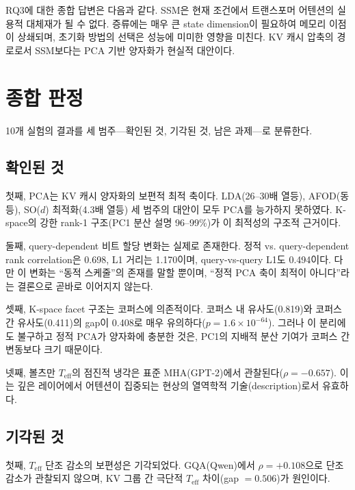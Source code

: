 \documentclass[11pt,a4paper]{article}
\newcommand{\teff}{T_\mathrm{eff}}
\begin{document}
RQ3에 대한 종합 답변은 다음과 같다. SSM은 현재 조건에서 트랜스포머 어텐션의 실용적 대체재가 될 수 없다. 증류에는 매우 큰 state dimension이 필요하여 메모리 이점이 상쇄되며, 초기화 방법의 선택은 성능에 미미한 영향을 미친다. KV 캐시 압축의 경로로서 SSM보다는 PCA 기반 양자화가 현실적 대안이다.

\newpage

\section{종합 판정}

10개 실험의 결과를 세 범주---확인된 것, 기각된 것, 남은 과제---로 분류한다.

\subsection{확인된 것}

첫째, PCA는 KV 캐시 양자화의 보편적 최적 축이다. LDA(26--30배 열등), AFOD(동등), SO($d$) 최적화(4.3배 열등) 세 범주의 대안이 모두 PCA를 능가하지 못하였다. K-space의 강한 rank-1 구조(PC1 분산 설명 96--99\%)가 이 최적성의 구조적 근거이다.

둘째, query-dependent 비트 할당 변화는 실제로 존재한다. 정적 vs. query-dependent rank correlation은 0.698, L1 거리는 1.170이며, query-vs-query L1도 0.494이다. 다만 이 변화는 ``동적 스케줄''의 존재를 말할 뿐이며, ``정적 PCA 축이 최적이 아니다''라는 결론으로 곧바로 이어지지 않는다.

셋째, K-space facet 구조는 코퍼스에 의존적이다. 코퍼스 내 유사도(0.819)와 코퍼스 간 유사도(0.411)의 gap이 0.408로 매우 유의하다($p = 1.6 \times 10^{-64}$). 그러나 이 분리에도 불구하고 정적 PCA가 양자화에 충분한 것은, PC1의 지배적 분산 기여가 코퍼스 간 변동보다 크기 때문이다.

넷째, 볼츠만 $\teff$의 점진적 냉각은 표준 MHA(GPT-2)에서 관찰된다($\rho = -0.657$). 이는 깊은 레이어에서 어텐션이 집중되는 현상의 열역학적 기술(description)로서 유효하다.

\subsection{기각된 것}

첫째, $\teff$ 단조 감소의 보편성은 기각되었다. GQA(Qwen)에서 $\rho = +0.108$으로 단조 감소가 관찰되지 않으며, KV 그룹 간 극단적 $\teff$ 차이(gap $= 0.506$)가 원인이다.
\end{document}
